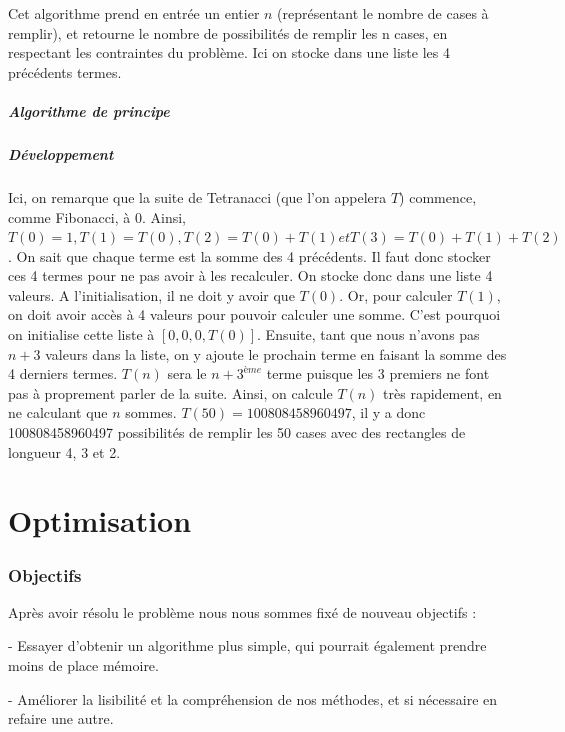 \documentclass{article}
\begin{document}
Cet algorithme prend en entrée un entier $n$ (représentant le nombre de cases à remplir), et retourne le nombre de possibilités de remplir les n cases, en respectant les contraintes du problème. Ici on stocke dans une liste les 4 précédents termes.

\subsubsection{Algorithme de principe}



\subsubsection{Développement}
Ici, on remarque que la suite de Tetranacci (que l'on appelera $T$) commence, comme Fibonacci, à 0. Ainsi, $T(0) = 1, T(1) = T(0), T(2) = T(0) + T(1) et T(3) = T(0) + T(1) + T(2)$. On sait que chaque terme est la somme des 4 précédents. Il faut donc stocker ces 4 termes pour ne pas avoir à les recalculer. On stocke donc dans une liste 4 valeurs. A l'initialisation, il ne doit y avoir que $T(0)$. Or, pour calculer $T(1)$, on doit avoir accès à 4 valeurs pour pouvoir calculer une somme. C'est pourquoi on initialise cette liste à $[0,0,0,T(0)]$. Ensuite, tant que nous n'avons pas $n+3$ valeurs dans la liste, on y ajoute le prochain terme en faisant la somme des 4 derniers termes. $T(n)$ sera le $n+3^{ème}$ terme puisque les 3 premiers ne font pas à proprement parler de la suite. Ainsi, on calcule $T(n)$ très rapidement, en ne calculant que $n$ sommes. $T(50) = 100808458960497$, il y a donc 100808458960497 possibilités de remplir les 50 cases avec des rectangles de longueur 4, 3 et 2.

\newpage
\part {Optimisation}
\section {Objectifs}

Après avoir résolu le problème nous nous sommes fixé de nouveau objectifs :

\noindent - Essayer d'obtenir un algorithme plus simple, qui pourrait également prendre moins de place mémoire.

\noindent - Améliorer la lisibilité et la compréhension de nos méthodes, et si nécessaire en refaire une autre.
\end{document}
